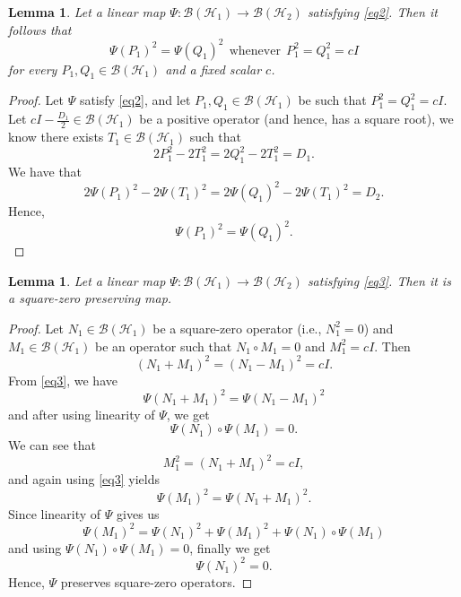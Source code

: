 \documentclass{amsart}
\newtheorem{lemma}[theorem]{Lemma}
\theoremstyle{definition}
\theoremstyle{remark}
\numberwithin{equation}{section}
\begin{document}
\begin{lemma}
	\label{lem3}
	Let a linear map $\Psi: \mathscr{B}(\mathscr{H}_1) \to \mathscr{B}(\mathscr{H}_2)$ satisfying \ref{eq2}. Then it follows that
    \begin{equation}
        \label{eq3}
        \Psi(P_1)^2=\Psi(Q_1)^2 ~~\text{whenever}~~P_1^2=Q_1^2=cI
    \end{equation}
    for every $P_1, Q_1 \in \mathscr{B}(\mathscr{H}_1)$ and a fixed scalar $c$.
\end{lemma}
\begin{proof}
	Let $\Psi$ satisfy \ref{eq2}, and let $P_1, Q_1 \in \mathscr{B}(\mathscr{H}_1)$ be such that $P_1^2=Q_1^2=cI$. Let $cI- \frac{D_1}{2} \in \mathscr{B}(\mathscr{H}_1)$ be a positive operator (and hence, has a square root), we know there exists $T_1 \in \mathscr{B}(\mathscr{H}_1)$ such that $$2P_1^2-2T_1^2=2Q_1^2-2T_1^2=D_1.$$ We have that $$2\Psi(P_1)^2-2\Psi(T_1)^2=2\Psi(Q_1)^2-2\Psi(T_1)^2=D_2.$$ Hence, $$\Psi(P_1)^2=\Psi(Q_1)^2.$$
\end{proof}
\begin{lemma}
    \label{lem4}
    Let a linear map $\Psi: \mathscr{B}(\mathscr{H}_1) \to \mathscr{B}(\mathscr{H}_2)$ satisfying \ref{eq3}. Then it is a square-zero preserving map.
\end{lemma}
\begin{proof}
    Let $N_1 \in \mathscr{B}(\mathscr{H}_1)$ be a square-zero operator (i.e., $N_1^2=0$) and $M_1 \in \mathscr{B}(\mathscr{H}_1)$ be an operator such that $N_1 \circ M_1=0$ and $M_1^2=cI$. Then $$(N_1+M_1)^2=(N_1-M_1)^2=cI.$$ From \ref{eq3}, we have $$\Psi(N_1+M_1)^2=\Psi(N_1-M_1)^2$$ and after using linearity of $\Psi$, we get $$\Psi(N_1) \circ \Psi(M_1)=0.$$ We can see that $$M_1^2=(N_1+M_1)^2=cI,$$ and again using \ref{eq3} yields $$\Psi(M_1)^2=\Psi(N_1+M_1)^2.$$ Since linearity of $\Psi$ gives us $$\Psi(M_1)^2=\Psi(N_1)^2+\Psi(M_1)^2+\Psi(N_1)\circ \Psi(M_1)$$ and using $\Psi(N_1)\circ \Psi(M_1)=0$, finally we get $$\Psi(N_1)^2=0.$$ Hence, $\Psi$ preserves square-zero operators.
\end{proof}
\end{document}
